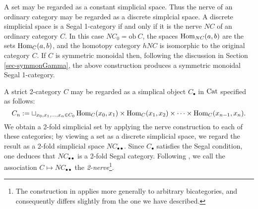\documentclass{amsart}
\begin{document}
\begin{example}
	A set may be regarded as a constant simplicial space. Thus the nerve of an ordinary category may be regarded as a discrete simplcial space. A discrete simplicial space is a Segal 1-category if and only if it is the nerve $NC$ of an ordinary category $C$. In this case $NC_0 = \textrm{ob}\ C$, the spaces $\operatorname{Hom}_{NC}(a,b)$ are the sets $\operatorname{Hom}_C(a,b)$, and the homotopy category $\mathit{h}NC$ is isomorphic to the original category $C$. If $C$ is symmetric monoidal then, following the discussion in Section \ref{sec-symmonGamma}, the above construction produces a symmetric monoidal Segal 1-category.  
\end{example}

\begin{example}
	A strict 2-category $C$ may be regarded as a simplical object $C_\bullet$ in $\mathrm{Cat}$ specified as follows:
	\begin{equation*}
		C_n := \sqcup_{x_0, x_1, \dots, x_n \in C_0} \operatorname{Hom}_C(x_0, x_1) \times \operatorname{Hom}_C(x_1, x_2) \times \cdots \times \operatorname{Hom}_C(x_{n-1}, x_n).
	\end{equation*}
	We obtain a 2-fold simplicial set by applying the nerve construction to each of these categories; by viewing a set as a discrete simplicial space, we regard the result as a 2-fold simplicial space $NC_{\bullet \bullet}$. Since $C_\bullet$ satisfies the Segal condition, one deduces that $NC_{\bullet \bullet}$ is a 2-fold Segal category. 
Following \cite{MR2366560}, we call the association $C \mapsto NC_{\bullet \bullet}$ the {\em 2-nerve}\footnote{The construction in \cite{MR2366560} applies more generally to arbitrary bicategories, and consequently differs slightly from the one we have described.}.  
\end{example}
\end{document}

